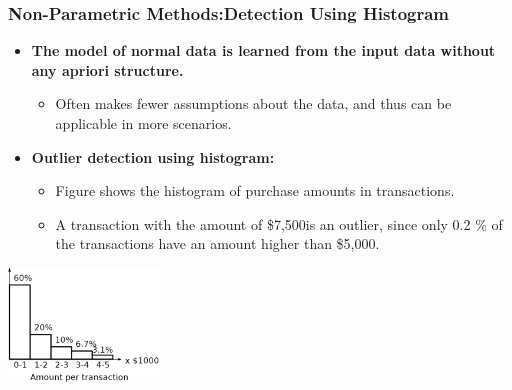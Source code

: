 \documentclass[aspectratio=169,t,xcolor=dvipsnames]{beamer}
\begin{document}
\begin{frame}
	\frametitle{Non-Parametric Methods:Detection Using Histogram}
	\begin{itemize}
		\item \textbf{The model of normal data is learned from the input data without any apriori structure.}
		      \begin{itemize}
		      	\item Often makes fewer assumptions about the data, and thus can be applicable in more scenarios.
		      \end{itemize}
		\item \textbf{Outlier detection using histogram:}
		      \begin{itemize}
		      	\item Figure shows the histogram of purchase amounts in transactions.
		      	\item A transaction with the amount of \$7,500is an outlier, since only 0.2
\% of the transactions have an amount higher than \$5,000.
		      \end{itemize}
	\end{itemize}
	\includegraphics[width=0.3\textwidth]{img/histogram8.png}

\end{frame}

%
\end{document}
